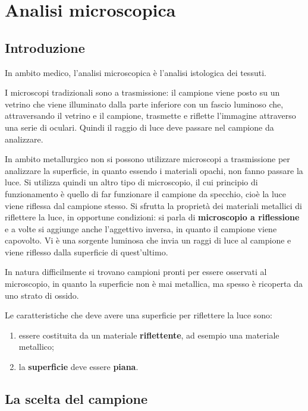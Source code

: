 \setchapterpreamble[u]{\margintoc}
\chapter{Analisi microscopica}

\section{Introduzione}

In ambito medico, l’analisi microscopica è l’analisi istologica dei tessuti.

I microscopi tradizionali sono a trasmissione: il campione viene posto su un vetrino che viene illuminato dalla parte inferiore con un fascio luminoso che, attraversando il vetrino e il campione, trasmette e riflette l’immagine attraverso una serie di oculari. Quindi il raggio di luce deve passare nel campione da analizzare.

In ambito metallurgico non si possono utilizzare microscopi a trasmissione per analizzare la superficie, in quanto essendo i materiali opachi, non fanno passare la luce.
Si utilizza quindi un altro tipo di microscopio, il cui principio di funzionamento è quello di far funzionare il campione da specchio, cioè la luce viene riflessa dal campione stesso. Si sfrutta la proprietà dei materiali metallici di riflettere la luce, in opportune condizioni: si parla di \textbf{microscopio a riflessione} e a volte si aggiunge anche l’aggettivo inversa, in quanto il campione viene capovolto. Vi è una sorgente luminosa che invia un raggi di luce al campione e viene riflesso dalla superficie di quest’ultimo.

In natura difficilmente si trovano campioni pronti per essere osservati al microscopio, in quanto la superficie non è mai metallica, ma spesso è ricoperta da uno strato di ossido.

Le caratteristiche che deve avere una superficie per riflettere la luce sono:
\begin{enumerate}
    \item essere costituita da un materiale \textbf{riflettente}, ad esempio una materiale metallico;
    \item la \textbf{superficie} deve essere \textbf{piana}.
\end{enumerate}

\section{La scelta del campione}


